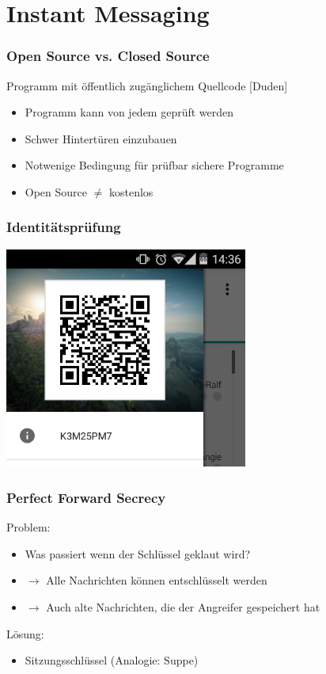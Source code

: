 \section{Instant Messaging}


\begin{frame}
  \frametitle{Open Source vs. Closed Source}
  \begin{definition}
   Programm mit öffentlich zugänglichem Quellcode \hfill \tiny [Duden]
  \end{definition}

  \begin{itemize}
   \item Programm kann von jedem geprüft werden
   \item Schwer Hintertüren einzubauen
   \item Notwenige Bedingung für prüfbar sichere Programme
   \item Open Source $\neq$ kostenlos
  \end{itemize}
\end{frame}

\begin{frame}
  \frametitle{Identitätsprüfung}
  \center
  \includegraphics[width=0.6\textwidth]{figures/Threema_ID.png}
\end{frame}

\begin{frame}
  \frametitle{Perfect Forward Secrecy}
  Problem:
  \begin{itemize}
    \item Was passiert wenn der Schlüssel geklaut wird?
    \pause
    \item $\rightarrow$ Alle Nachrichten können entschlüsselt werden
    \item $\rightarrow$ Auch alte Nachrichten, die der Angreifer gespeichert hat
  \end{itemize}
  \pause
  Lösung:
  \begin{itemize}
    \item Sitzungsschlüssel (Analogie: Suppe)
  \end{itemize}
  \center {}
\end{frame}

